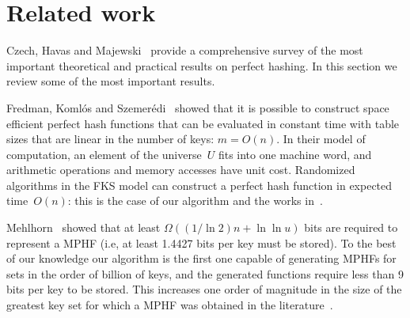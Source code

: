 \vspace{-3mm}
\section{Related work}
\label{sec:relatedprevious-work}
\vspace{-2mm}


\enlargethispage{2\baselineskip}
Czech, Havas and Majewski~\cite{chm97} provide a
comprehensive survey of the most important theoretical and practical results
on perfect hashing.
In this section we review some of the most important results.

Fredman, Koml\'os and Szemer\'edi~\cite{FKS84} showed that it is possible to
construct space efficient perfect hash functions that can be evaluated in
constant time with table sizes that are linear in the number of keys:
$m=O(n)$.  In their model of computation, an element of the universe~$U$ fits
into one machine word, and arithmetic operations and memory accesses have unit
cost.  Randomized algorithms in the FKS model can construct a perfect hash
function in expected time~$O(n)$:
this is the case of our algorithm and the works in~\cite{chm92,p99}.

Mehlhorn~\cite{m84} showed
that at least $\Omega((1/\ln 2)n + \ln\ln u)$ bits are 
required to represent a MPHF (i.e, at least 1.4427 bits per
key must be stored).
To the best of our knowledge our algorithm 
is the first one capable of generating MPHFs for sets in the order
of billion of keys, and the generated functions  
require less than 9 bits per key to be stored.
This increases one order of magnitude in the size of the greatest 
key set for which a MPHF was obtained in the literature~\cite{bkz05}.

